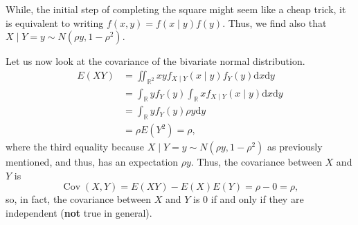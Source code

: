 \documentclass[
]{article}
\theoremstyle{definition}
\begin{document}
While, the initial step of completing the square might seem like a cheap
trick, it is equivalent to writing \(f(x, y) = f(x \mid y)f(y)\). Thus,
we find also that \(X \mid Y = y \sim N(\rho y, 1 - \rho ^2)\).

Let us now look at the covariance of the bivariate normal distribution.
\begin{align*}
  E(XY) & = \iint_{\mathbb{R}^2} x y f_{X \mid Y}(x \mid y) f_Y(y)\text{d}x\text{d}y\\
        & = \int_\mathbb{R} y f_Y(y) \int_\mathbb{R} x f_{X \mid Y} (x \mid y)\text{d}x\text{d}y\\
        & = \int_\mathbb{R} y f_Y(y) \rho y \text{d}y\\
        & = \rho E(Y^2) = \rho,
\end{align*} where the third equality because
\(X \mid Y = y\sim N(\rho y, 1 - \rho ^2)\) as previously mentioned, and
thus, has an expectation \(\rho y\). Thus, the covariance between \(X\)
and \(Y\) is \[
  \mathop{\mathrm{Cov}}(X, Y) = E(XY) - E(X)E(Y) = \rho - 0 = \rho,   
\] so, in fact, the covariance between \(X\) and \(Y\) is 0 if and only
if they are independent (\textbf{not} true in general).
\end{document}
